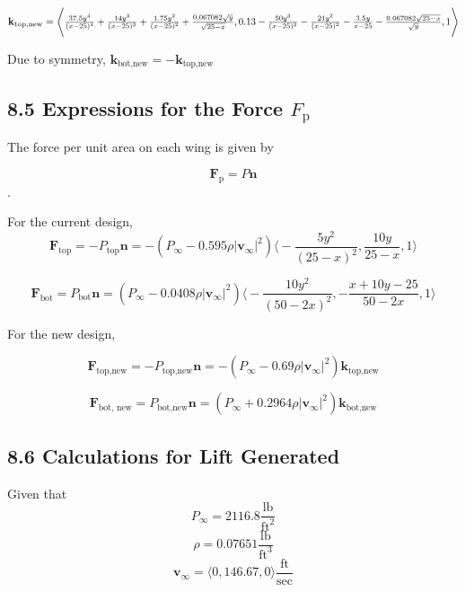 \documentclass[12pt]{article}
\begin{document}
\[
\mathbf{k}_\text{top,new} = \scalebox{0.95}{$
\Bigg \langle \frac{37.5y^4}{(x-25)^4} + \frac{14y^3}{(x-25)^3} + \frac{1.75y^2}{(x-25)^2} + \frac{0.067082\sqrt{y}}{\sqrt{25-x}}, 
0.13 - \frac{50y^3}{(x - 25)^3} - \frac{21y^2}{(x - 25)^2} - \frac{3.5y}{x - 25} - \frac{0.067082\sqrt{25 - x}}{\sqrt{y}}, 1 \Bigg \rangle
$}
\]

Due to symmetry, $\mathbf{k}_\text{bot,new} = -\mathbf{k}_\text{top,new}$







\subsection*{8.5 Expressions for the Force $F_\text{p}$}

The force per unit area on each wing is given by 

\[ \mathbf{F}_\text{p} = P\mathbf{n}\]. 

For the current design, 
\[ \mathbf{F}_\text{top} = -P_\text{top}\mathbf{n} = -\left(P_{\infty} - 0.595 \rho |\mathbf{v}_{\infty}|^2\right)  \Bigg\langle -\frac{5y^2}{(25 - x)^2}, \frac{10y}{25 - x}, 1 \Bigg\rangle  \]

\[ \mathbf{F}_\text{bot} = P_\text{bot}\mathbf{n} = \left(P_{\infty} - 0.0408 \rho |\mathbf{v}_{\infty}|^2\right)  \Bigg\langle -\frac{10y^2}{(50 - 2x)^2}, -\frac{x + 10y - 25}{50 - 2x}, 1 \Bigg\rangle  \]

For the new design, 

\[ \mathbf{F}_\text{top,new} = -P_\text{top,new}\mathbf{n} = -\left(P_\infty - 0.69 \rho |\mathbf{v}_\infty|^2\right) \mathbf{k}_\text{top,new}   \]

\[ \mathbf{F}_\text{bot, new} = P_\text{bot,new}\mathbf{n} = \left( P_\infty + 0.2964 \rho|\mathbf{v}_\infty|^2 \right)\mathbf{k}_\text{bot,new} \]

\subsection*{8.6 Calculations for Lift Generated}
Given that 
\[ P_\infty = 2116.8 \frac{\text{lb}}{\text{ft}^2}\]
\[ \rho = 0.07651 \frac{\text{lb}}{\text{ft}^3}\]
\[ \mathbf{v}_\infty = \langle 0, 146.67, 0 \rangle \frac{\text{ft}}{\text{sec}}\]
\end{document}
